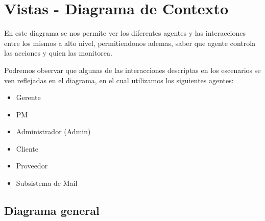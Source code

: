 \section{Vistas - Diagrama de Contexto}
En este diagrama se nos permite ver los diferentes agentes y las interacciones entre los mismos a alto nivel,
permitiendonos ademas, saber que agente controla las acciones y quien las monitorea.

Podremos observar que algunas de las interacciones descriptas en los escenarios se ven reflejadas en el diagrama, en el cual utilizamos los siguientes agentes:
\begin{itemize}
\item Gerente
\item PM 
\item Administrador (Admin) 
\item Cliente 
\item Proveedor
\item Subsistema de Mail 
\end{itemize}

\subsection{Diagrama general}


